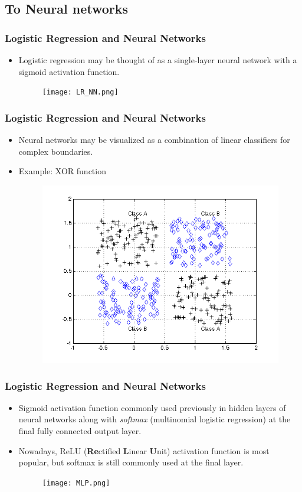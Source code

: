 \subsection{To Neural networks}
\begin{frame}
\frametitle{Logistic Regression and Neural Networks}
\begin{itemize}
\item Logistic regression may be thought of as a single-layer neural network with a sigmoid activation function.
\begin{figure}
\texttt{[image: LR\_NN.png]}
\end{figure}
\end{itemize}
\end{frame}
\begin{frame}
\frametitle{Logistic Regression and Neural Networks}
\begin{itemize}
\item Neural networks may be visualized as a combination of linear classifiers for complex boundaries.
\item Example: XOR function
\begin{figure}
\includegraphics[width=0.6\linewidth]{xor_image.png}
\end{figure}
\end{itemize}
\end{frame}
\begin{frame}
\frametitle{Logistic Regression and Neural Networks}
\begin{itemize}
\item Sigmoid activation function commonly used previously in hidden layers of neural networks along with \textit{softmax} (multinomial logistic regression) at the final fully connected output layer. 
\item Nowadays, ReLU (\textbf{Re}ctified \textbf{L}inear \textbf{U}nit) activation function is most popular, but softmax is still commonly used at the final layer.
\begin{figure}
\texttt{[image: MLP.png]}
\end{figure}
\end{itemize}
\end{frame}
